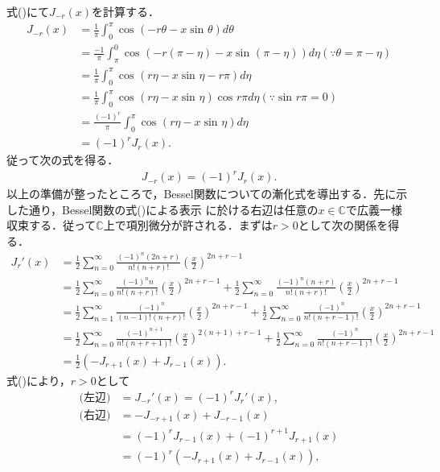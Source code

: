 \documentclass[a4j,papersize,disablejfam,slide,14pt]{jsarticle}
\def\sin#1#2{\operatorname{sin}^{#2} #1} %
\def\cos#1#2{\operatorname{cos}^{#2} #1} %
\begin{document}
    式()にて$J_{-r}(x)$を計算する．
    \begin{align}
    	J_{-r}(x) &= \frac{1}{\pi} \int_{0}^{\pi} \cos{(-r\theta - x\sin{\theta}{})}{} d\theta \\
        &= \frac{-1}{\pi} \int_{\pi}^{0} \cos{(-r(\pi - \eta) - x\sin{(\pi - \eta)}{})}{} d\eta (\because \theta = \pi - \eta) \\
        &= \frac{1}{\pi} \int_{0}^{\pi} \cos{(r\eta - x\sin{\eta}{} - r\pi)}{} d\eta \\
        &= \frac{1}{\pi} \int_{0}^{\pi} \cos{(r\eta - x\sin{\eta}{})}{}\cos{r\pi}{} d\eta (\because \sin{r\pi}{}=0) \\
        &= \frac{(-1)^r}{\pi} \int_{0}^{\pi} \cos{(r\eta - x\sin{\eta}{})}{} d\eta \\
        &= (-1)^r J_r(x).
    \end{align}
    従って次の式を得る．
    \begin{align}
    	J_{-r}(x) = (-1)^r J_r(x). \label{eq:bessel_symmetry}
    \end{align}
    以上の準備が整ったところで，{\rm Bessel}関数についての漸化式を導出する．先に示した通り，{\rm Bessel}関数の式()による表示
    に於ける右辺は任意の$x \in \mathbb{C}$で広義一様収束する．従って$\mathbb{C}$上で項別微分が許される．まずは$r>0$として次の関係を得る．
    \begin{align}
    	J_r'(x) &= \frac{1}{2} \sum_{n=0}^{\infty} \frac{(-1)^n (2n+r)}{n!(n+r)!}\left( \frac{x}{2} \right)^{2n+r-1} \\
        &= \frac{1}{2} \sum_{n=0}^{\infty} \frac{(-1)^n n}{n!(n+r)!}\left( \frac{x}{2} \right)^{2n+r-1}
        	+ \frac{1}{2} \sum_{n=0}^{\infty} \frac{(-1)^n (n+r)}{n!(n+r)!}\left( \frac{x}{2} \right)^{2n+r-1} \\
        &= \frac{1}{2} \sum_{n=1}^{\infty} \frac{(-1)^n}{(n-1)!(n+r)!}\left( \frac{x}{2} \right)^{2n+r-1} 
        	+ \frac{1}{2} \sum_{n=0}^{\infty} \frac{(-1)^n}{n!(n+r-1)!}\left( \frac{x}{2} \right)^{2n+r-1} \\
        &= \frac{1}{2} \sum_{n=0}^{\infty} \frac{(-1)^{n+1}}{n!(n+r+1)!}\left( \frac{x}{2} \right)^{2(n+1)+r-1} 
        	+ \frac{1}{2} \sum_{n=0}^{\infty} \frac{(-1)^n}{n!(n+r-1)!}\left( \frac{x}{2} \right)^{2n+r-1} \\
        &= \frac{1}{2} \left( -J_{r+1}(x) + J_{r-1}(x) \right).
    \end{align}
    式()により，$r>0$として
    \begin{align}
    	\mbox{(左辺)} &= J_{-r}'(x) = (-1)^r J_r'(x), \\
        \mbox{(右辺)} &= -J_{-r+1}(x) + J_{-r-1}(x) \\
        &= (-1)^r J_{r-1}(x) + (-1)^{r+1} J_{r+1}(x) \\
        &= (-1)^r (-J_{r+1}(x) + J_{r-1}(x)),
    \end{align}
\end{document}
